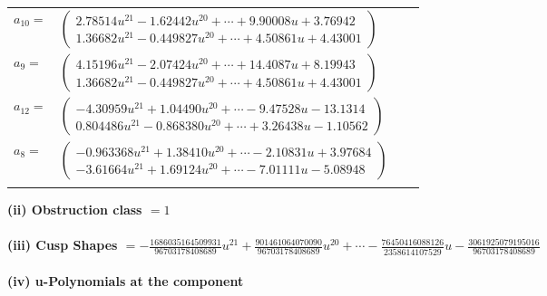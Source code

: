 \documentclass[1p]{elsarticle_modified}
\theoremstyle{definition}
\begin{document}
\begin{tabular}{m{7pt} m{180pt} m{7pt} m{180pt} }
\flushright $a_{10}=$&$\begin{pmatrix}2.78514 u^{21}-1.62442 u^{20}+\cdots+9.90008 u+3.76942\\1.36682 u^{21}-0.449827 u^{20}+\cdots+4.50861 u+4.43001\end{pmatrix}$ \\
\flushright $a_{9}=$&$\begin{pmatrix}4.15196 u^{21}-2.07424 u^{20}+\cdots+14.4087 u+8.19943\\1.36682 u^{21}-0.449827 u^{20}+\cdots+4.50861 u+4.43001\end{pmatrix}$ \\
\flushright $a_{12}=$&$\begin{pmatrix}-4.30959 u^{21}+1.04490 u^{20}+\cdots-9.47528 u-13.1314\\0.804486 u^{21}-0.868380 u^{20}+\cdots+3.26438 u-1.10562\end{pmatrix}$ \\
\flushright $a_{8}=$&$\begin{pmatrix}-0.963368 u^{21}+1.38410 u^{20}+\cdots-2.10831 u+3.97684\\-3.61664 u^{21}+1.69124 u^{20}+\cdots-7.01111 u-5.08948\end{pmatrix}$\\&\end{tabular}
\flushleft \textbf{(ii) Obstruction class $= 1$}\\~\\
\flushleft \textbf{(iii) Cusp Shapes $= -\frac{1686035164509931}{96703178408689} u^{21}+\frac{901461064070090}{96703178408689} u^{20}+\cdots-\frac{76450416088126}{2358614107529} u-\frac{3061925079195016}{96703178408689}$}\\~\\
\newpage\renewcommand{\arraystretch}{1}
\flushleft \textbf{(iv) u-Polynomials at the component}\newline \\
\end{document}
